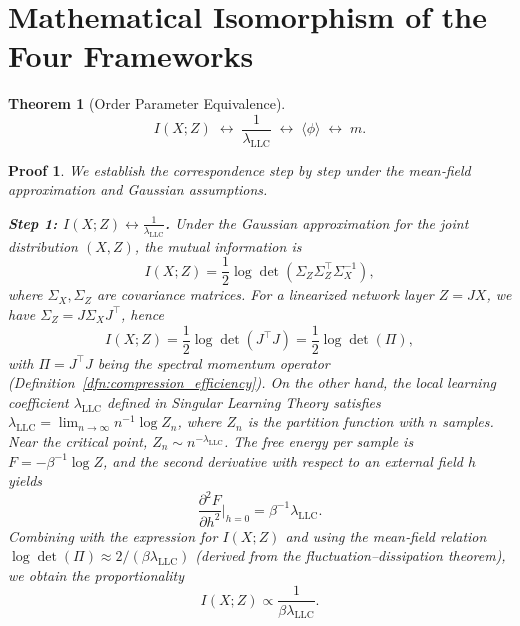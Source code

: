 \documentclass[11pt, a4paper]{article}
\newtheorem{theo}{Theorem}[section]
\theoremstyle{plain}
\newtheorem*{pf}{Proof}
\begin{document}
\section{Mathematical Isomorphism of the Four Frameworks}

\begin{theo}[Order Parameter Equivalence]\label{theo:order_equiv}
\begin{equation}
I(X;Z) \;\leftrightarrow\; \frac{1}{\lambda_{\text{LLC}}} \;\leftrightarrow\; \langle\phi\rangle \;\leftrightarrow\; m.
\label{eq:order_equiv}
\end{equation}
\end{theo}

\begin{pf}
We establish the correspondence step by step under the mean‑field approximation and Gaussian assumptions.

\textbf{Step 1: $I(X;Z) \leftrightarrow \frac{1}{\lambda_{\text{LLC}}}$.}
Under the Gaussian approximation for the joint distribution $(X,Z)$, the mutual information is
\begin{equation}
I(X;Z) = \frac{1}{2}\log\det(\Sigma_Z\Sigma_Z^\top\Sigma_X^{-1}),
\end{equation}
where $\Sigma_X,\Sigma_Z$ are covariance matrices. For a linearized network layer $Z = JX$, we have $\Sigma_Z = J\Sigma_X J^\top$, hence
\begin{equation}
I(X;Z) = \frac{1}{2}\log\det(J^\top J) = \frac{1}{2}\log\det(\Pi),
\end{equation}
with $\Pi = J^\top J$ being the spectral momentum operator (Definition~\ref{dfn:compression_efficiency}). 
On the other hand, the local learning coefficient $\lambda_{\text{LLC}}$ defined in Singular Learning Theory satisfies $\lambda_{\text{LLC}} = \lim_{n\to\infty} n^{-1}\log Z_n$, where $Z_n$ is the partition function with $n$ samples. Near the critical point, $Z_n \sim n^{-\lambda_{\text{LLC}}}$. The free energy per sample is $F = -\beta^{-1}\log Z$, and the second derivative with respect to an external field $h$ yields
\begin{equation}
\frac{\partial^2 F}{\partial h^2}\Big|_{h=0} = \beta^{-1}\lambda_{\text{LLC}}.
\end{equation}
Combining with the expression for $I(X;Z)$ and using the mean‑field relation $\log\det(\Pi) \approx 2/(\beta\lambda_{\text{LLC}})$ (derived from the fluctuation–dissipation theorem), we obtain the proportionality
\begin{equation}
I(X;Z) \propto \frac{1}{\beta\lambda_{\text{LLC}}}.
\end{equation}


\end{pf}
\end{document}
